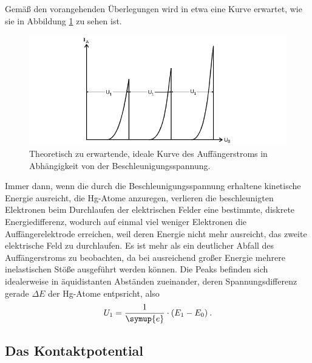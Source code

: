 Gemäß den vorangehenden Überlegungen wird in etwa eine Kurve erwartet, wie sie in Abbildung \ref{fig:erwartKurve} zu sehen ist. 
\begin{figure}
    \centering
    \includegraphics[width=\textwidth]{plots/erwartKurve.png}
    \caption{Theoretisch zu erwartende, ideale Kurve des Auffängerstroms in Abhängigkeit von der Beschleunigungsspannung\cite{Versuchsanleitung}.}
    \label{fig:erwartKurve}
\end{figure}
Immer dann, wenn die durch die Beschleunigungsspannung erhaltene kinetische Energie ausreicht, die Hg-Atome anzuregen, 
verlieren die beschleunigten Elektronen beim Durchlaufen der elektrischen Felder eine bestimmte, diskrete Energiedifferenz, 
wodurch auf einmal viel weniger Elektronen die Auffängerelektrode erreichen, weil deren Energie nicht mehr ausreicht, das 
zweite elektrische Feld zu durchlaufen. 
Es ist mehr als ein deutlicher Abfall des Auffängerstroms zu beobachten, da bei ausreichend großer Energie 
mehrere inelastischen Stöße ausgeführt werden können. 
Die Peaks befinden sich idealerweise in äquidistanten 
Abständen zueinander, deren Spannungsdifferenz gerade $\Delta E$ der Hg-Atome entpsricht, also 
\begin{equation*}
    U_1= \frac{1}{\symup{e}}\cdot (E_1-E_0)\:.
\end{equation*}

\subsection{Das Kontaktpotential}

